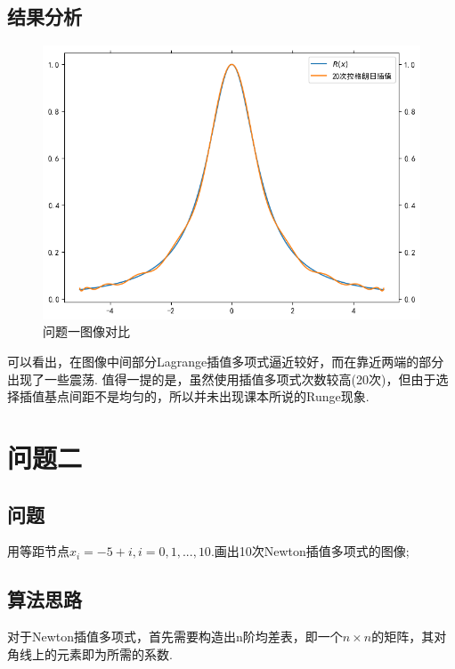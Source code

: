 \documentclass[UTF8,ctexart,a4paper,11pt,openany]{article}
\theoremstyle{definition}
\begin{document}
    \subsection{结果分析}%
    \begin{figure}[H]
        \centering
        \includegraphics{pics/P3.1.png}
        \caption{问题一图像对比}
        \label{graph:1}
        \end{figure}
    可以看出，在图像中间部分Lagrange插值多项式逼近较好，而在靠近两端的部分出现了一些震荡. 值得一提的是，虽然使用插值多项式次数较高(20次)，但由于选择插值基点间距不是均匀的，所以并未出现课本所说的Runge现象.
\section{问题二} 
    \subsection{问题}
    用等距节点$x_i=-5+i, i=0,1,...,10.$画出10次Newton插值多项式的图像;
    \subsection{算法思路}
    对于Newton插值多项式，首先需要构造出n阶均差表，即一个$n\times n$的矩阵，其对角线上的元素即为所需的系数.
\end{document}
